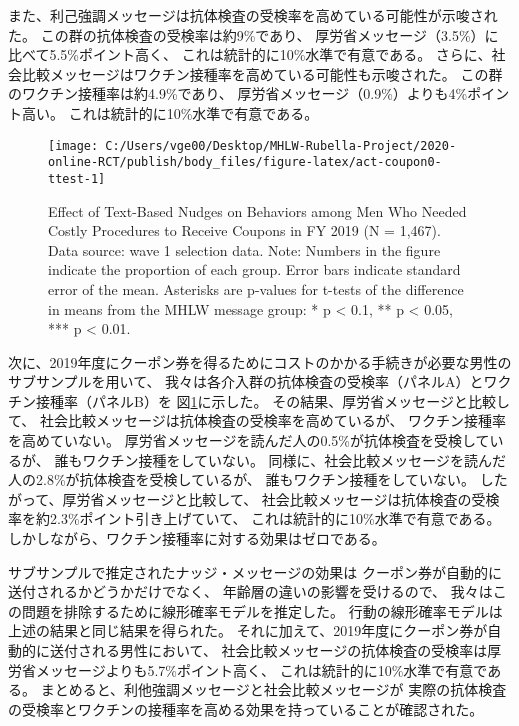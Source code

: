 \documentclass[
  11pt,
  a4paper,
]{article}
\begin{document}
また、利己強調メッセージは抗体検査の受検率を高めている可能性が示唆された。
この群の抗体検査の受検率は約9\%であり、
厚労省メッセージ（3.5\%）に比べて5.5\%ポイント高く、
これは統計的に10\%水準で有意である。
さらに、社会比較メッセージはワクチン接種率を高めている可能性も示唆された。
この群のワクチン接種率は約4.9\%であり、
厚労省メッセージ（0.9\%）よりも4\%ポイント高い。
これは統計的に10\%水準で有意である。

\begin{figure}[t]
\texttt{[image: C:/Users/vge00/Desktop/MHLW-Rubella-Project/2020-online-RCT/publish/body\_files/figure-latex/act-coupon0-ttest-1]} \caption{Effect of Text-Based Nudges on Behaviors among Men Who Needed Costly Procedures to Receive Coupons in FY 2019 (N = 1,467). Data source: wave 1 selection data. Note: Numbers in the figure indicate the proportion of each group. Error bars indicate standard error of the mean. Asterisks are p-values for t-tests of the difference in means from the MHLW message group: * p < 0.1, ** p < 0.05, *** p < 0.01.}\label{fig:act-coupon0-ttest}
\end{figure}

次に、2019年度にクーポン券を得るためにコストのかかる手続きが必要な男性のサブサンプルを用いて、
我々は各介入群の抗体検査の受検率（パネルA）とワクチン接種率（パネルB）を
図\ref{fig:act-coupon0-ttest}に示した。
その結果、厚労省メッセージと比較して、
社会比較メッセージは抗体検査の受検率を高めているが、
ワクチン接種率を高めていない。
厚労省メッセージを読んだ人の0.5\%が抗体検査を受検しているが、
誰もワクチン接種をしていない。
同様に、社会比較メッセージを読んだ人の2.8\%が抗体検査を受検しているが、
誰もワクチン接種をしていない。
したがって、厚労省メッセージと比較して、
社会比較メッセージは抗体検査の受検率を約2.3\%ポイント引き上げていて、
これは統計的に10\%水準で有意である。
しかしながら、ワクチン接種率に対する効果はゼロである。

サブサンプルで推定されたナッジ・メッセージの効果は
クーポン券が自動的に送付されるかどうかだけでなく、
年齢層の違いの影響を受けるので、
我々はこの問題を排除するために線形確率モデルを推定した。
行動の線形確率モデルは上述の結果と同じ結果を得られた。
それに加えて、2019年度にクーポン券が自動的に送付される男性において、
社会比較メッセージの抗体検査の受検率は厚労省メッセージよりも5.7\%ポイント高く、
これは統計的に10\%水準で有意である。
まとめると、利他強調メッセージと社会比較メッセージが
実際の抗体検査の受検率とワクチンの接種率を高める効果を持っていることが確認された。
\end{document}
